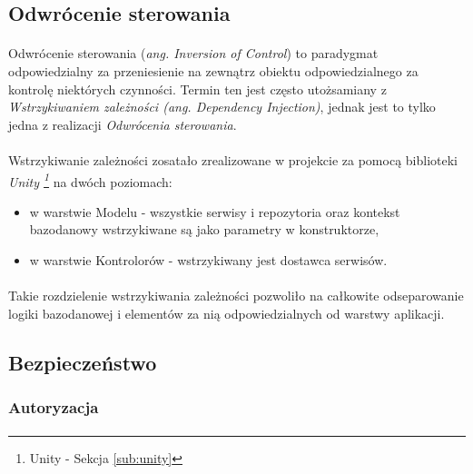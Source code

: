 \subsection{Odwrócenie sterowania} %
\label{sub:odwr_cenie_sterowania}
\paragraph{} 
Odwrócenie sterowania (\textit{ang. Inversion of Control}) to paradygmat odpowiedzialny za przeniesienie na zewnątrz obiektu odpowiedzialnego za kontrolę niektórych czynności. Termin ten jest często utożsamiany z \textit{Wstrzykiwaniem zależności (ang. Dependency Injection)}, jednak jest to tylko jedna z realizacji \textit{Odwrócenia sterowania}. 

\paragraph{} %
\label{par:}
Wstrzykiwanie zależności zosatało zrealizowane w projekcie za pomocą biblioteki \textit{Unity \footnote{Unity - Sekcja \ref{sub:unity}}} na dwóch poziomach:
\begin{itemize}
	\item w warstwie Modelu - wszystkie serwisy i repozytoria oraz kontekst bazodanowy wstrzykiwane są jako parametry w konstruktorze,
	\item w warstwie Kontrolorów - wstrzykiwany jest dostawca serwisów.
\end{itemize} 

\paragraph{} %
\label{par:}
Takie rozdzielenie wstrzykiwania zależności pozwoliło na całkowite odseparowanie logiki bazodanowej i elementów za nią odpowiedzialnych od warstwy aplikacji.

\subsection{Bezpieczeństwo} %
\subsubsection{Autoryzacja}
\paragraph{} %
\label{par:paragraph_name}


